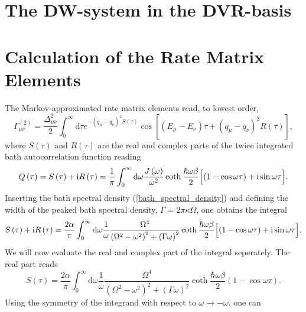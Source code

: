 \section{The DW-system in the DVR-basis}

\section{Calculation of the Rate Matrix Elements}

The Markov-approximated rate matrix elements read, to lowest order, 
%
\begin{equation}\label{rate_matrix_elements}
    \Gamma_{\mu\nu}^{(2)} = \frac{\Delta_{\mu\nu}^2}{2} \int_{0}^{\infty} \text{d} \tau 
    e^{- \left( q_\mu - q_\nu \right)^2 S \left( \tau \right)} \cos \left[ \left( E_\mu - E_\nu \right) 
    \tau + \left( q_\mu - q_\nu \right)^2 R \left( \tau \right) \right] ,
\end{equation}
%
where $S(\tau)$ and $R(\tau)$ are the real and complex parts of the twice integrated bath
autocorrelation function reading
%
\begin{equation}
    Q \left( \tau \right) = S \left( \tau \right) + \text{i} R \left( \tau \right) 
    = \frac{1}{\pi} \int_{0}^{\infty} \text{d}\omega \frac{J \left( \omega \right)}{\omega^2}
    \coth\frac{\hbar\omega\beta}{2} \Bigl[ \left( 1-\cos\omega\tau \right) + \text{i}\sin\omega\tau \Bigr] .
\end{equation}
%
Inserting the bath spectral density (\ref{bath_spectral_density}) and defining
the width of the peaked bath spectral density, $\Gamma = 2 \pi \kappa \Omega$, one obtains the integral
%
\begin{equation}
    S \left( \tau \right) + \text{i} R \left( \tau \right) = \frac{2 \alpha}{\pi} 
    \int_{0}^{\infty} \text{d}\omega \frac{1}{\omega} \frac{\Omega^4}{\left(\Omega^2-\omega^2\right)^2
    + \left(\Gamma\omega\right)^2}
    \coth\frac{\hbar\omega\beta}{2} \Bigl[ \left( 1-\cos\omega\tau \right) + \text{i}\sin\omega\tau \Bigr] .
\end{equation}
%
We will now evaluate the real and complex part of the integral seperately. The real part reads
%
\begin{equation}
    S \left( \tau \right) = \frac{2 \alpha}{\pi} 
    \int_{0}^{\infty} \text{d}\omega \frac{1}{\omega} \frac{\Omega^4}{\left(\Omega^2-\omega^2\right)^2
    + \left(\Gamma\omega\right)^2}
    \coth\frac{\hbar\omega\beta}{2} \left( 1-\cos\omega\tau \right).
\end{equation}
%
Using the symmetry of the integrand with respect to $\omega \rightarrow -\omega$, one can 
